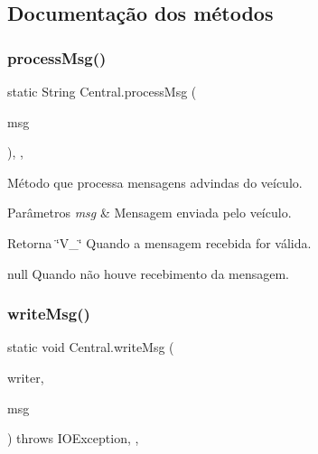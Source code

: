 \subsection{Documentação dos métodos}
\mbox{\label{class_central_a30d9b358a611ce826fcc31165745c228}} 
\subsubsection{\texorpdfstring{process\+Msg()}{processMsg()}}
{\footnotesize\ttfamily static String Central.\+process\+Msg (\begin{DoxyParamCaption}\item[{String}]{msg }\end{DoxyParamCaption})\hspace{0.3cm}{\ttfamily [inline]}, {\ttfamily [static]}, {\ttfamily [protected]}}



Método que processa mensagens advindas do veículo. 


\begin{DoxyParams}{Parâmetros}
{\em msg} & Mensagem enviada pelo veículo.\\
\hline
\end{DoxyParams}
\begin{DoxyReturn}{Retorna}
\char`\"{}\+V\+\_\char`\"{} Quando a mensagem recebida for válida. 

null Quando não houve recebimento da mensagem. 
\end{DoxyReturn}
\mbox{\label{class_central_a280abaf8e4b428b5c7a25065c61df800}} 
\subsubsection{\texorpdfstring{write\+Msg()}{writeMsg()}}
{\footnotesize\ttfamily static void Central.\+write\+Msg (\begin{DoxyParamCaption}\item[{Data\+Output\+Stream}]{writer,  }\item[{String}]{msg }\end{DoxyParamCaption}) throws I\+O\+Exception\hspace{0.3cm}{\ttfamily [inline]}, {\ttfamily [static]}, {\ttfamily [protected]}}



